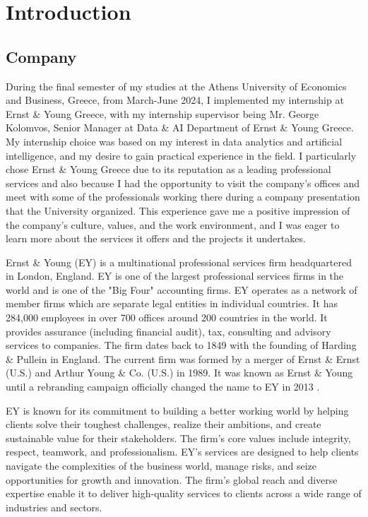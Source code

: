 \chapter{Introduction}
\label{ch:internship-intro}

\section{Company}

During the final semester of my studies at the Athens University of Economics
and Business, Greece, from March-June 2024, I implemented my internship at
Ernst \& Young Greece, with my internship supervisor being Mr. George Kolomvos,
Senior Manager at Data \& AI Department of Ernst \& Young Greece. My internship
choice was based on my interest in data analytics and artificial intelligence,
and my desire to gain practical experience in the field. I particularly chose
Ernst \& Young Greece due to its reputation as a leading professional services
and also because I had the opportunity to visit the company's offices and meet
with some of the professionals working there during a company presentation that
the University organized. This experience gave me a positive impression of the
company's culture, values, and the work environment, and I was eager to learn
more about the services it offers and the projects it undertakes.

Ernst \& Young (EY) is a multinational professional services firm headquartered
in London, England. EY is one of the largest professional services firms in the
world and is one of the "Big Four" accounting firms. EY operates as a network
of member firms which are separate legal entities in individual countries. It
has 284,000 employees in over 700 offices around 200 countries in the world. It
provides assurance (including financial audit), tax, consulting and advisory
services to companies. The firm dates back to 1849 with the founding of Harding
\& Pullein in England. The current firm was formed by a merger of Ernst \&
Ernst (U.S.) and Arthur Young \& Co. (U.S.) in 1989. It was known as Ernst \&
Young until a rebranding campaign officially changed the name to EY in 2013 \cite{Ey}.

EY is known for its commitment to building a better working world by helping
clients solve their toughest challenges, realize their ambitions, and create
sustainable value for their stakeholders. The firm's core values include
integrity, respect, teamwork, and professionalism. EY's services are designed
to help clients navigate the complexities of the business world, manage risks,
and seize opportunities for growth and innovation. The firm's global reach and
diverse expertise enable it to deliver high-quality services to clients across
a wide range of industries and sectors.

